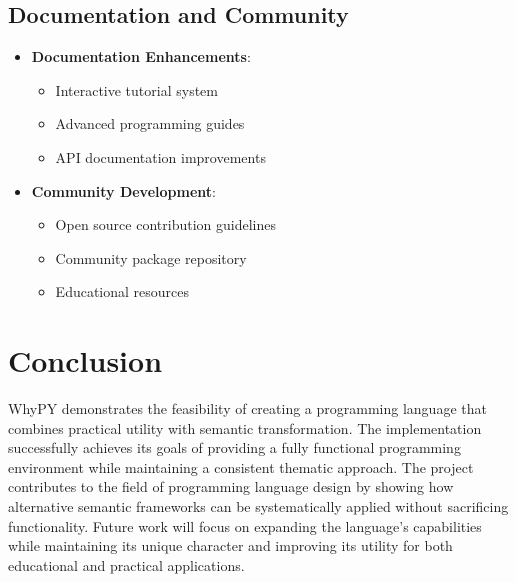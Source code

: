 \documentclass[conference]{IEEEtran}
\begin{document}
\subsection{Documentation and Community}
\begin{itemize}
    \item \textbf{Documentation Enhancements}:
    \begin{itemize}
        \item Interactive tutorial system
        \item Advanced programming guides
        \item API documentation improvements
    \end{itemize}
    
    \item \textbf{Community Development}:
    \begin{itemize}
        \item Open source contribution guidelines
        \item Community package repository
        \item Educational resources
    \end{itemize}
\end{itemize}

\section{Conclusion}
WhyPY demonstrates the feasibility of creating a programming language that combines practical utility with semantic transformation. The implementation successfully achieves its goals of providing a fully functional programming environment while maintaining a consistent thematic approach. The project contributes to the field of programming language design by showing how alternative semantic frameworks can be systematically applied without sacrificing functionality. Future work will focus on expanding the language's capabilities while maintaining its unique character and improving its utility for both educational and practical applications.
\end{document}
